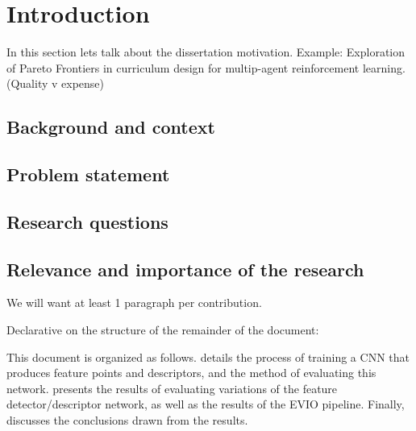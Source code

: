 \chapter{Introduction}%
\label{ch:introduction}

In this section lets talk about the dissertation motivation.
Example:
Exploration of Pareto Frontiers in curriculum design for multip-agent reinforcement learning. (Quality v expense)


\section{Background and context}%
\label{sec:background}

\section{Problem statement}%
\label{sec:problem_statement}

\section{Research questions}%
\label{sec:research_question}

\section{Relevance and importance of the research}%
\label{sec:relevance_and_importance}

We will want at least 1 paragraph per contribution.

Declarative on the structure of the remainder of the document:

This document is organized as follows. 
 details the process of training a \gls{CNN} that produces feature points and descriptors, and the method of evaluating this network. 
 presents the results of evaluating variations of the feature detector/descriptor network, as well as the results of the \gls{EVIO} pipeline. 
Finally,  discusses the conclusions drawn from the results.


